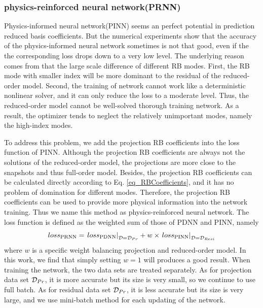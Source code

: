 \documentclass[preprint, 10pt]{elsarticle}
\begin{document}
\subsubsection{physics-reinforced neural network(PRNN)}
\label{PRNN}
Physics-informed neural network(PINN) seems an perfect potential in prediction reduced basis coefficients. But the numerical experiments show that  the accuracy of the physics-informed neural network sometimes is not that good, even if the the corresponding loss drops down to a very low level. The underlying reason comes from that the large scale difference of different RB modes.
First, the RB mode with smaller index will be more dominant to the residual of the reduced-order model. Second, the training of network cannot work like a deterministic nonlinear solver, and it can only reduce the loss to a moderate level. Thus, the reduced-order model cannot be well-solved thorough training network. As a result, the optimizer tends to neglect the relatively unimportant modes, namely the high-index modes.

To address this problem, we add the projection RB coefficients into the loss function of PINN. Although the projection RB coefficients are always not the solutions of the reduced-order model, the projections are more close to the snapshots and thus full-order model. Besides, the projection RB coefficients can be calculated directly according to Eq. \ref{eq_RBCoefficients}, and it has no problem of domination for different modes. Therefore, the projection RB coefficients can be used to provide more physical information into the network training. Thus we name this method as physics-reinforced neural network. The loss function is defined as the weighted sum of those of PDNN and PINN, namely
\begin{equation}
{loss}_{\rm{PRNN}} =
\left. {{loss}_{\rm{PDNN}}} \right|_{{\cal{D}} = {\cal {D}}_{Pr} }
+
w \times \left. {{loss}_{\rm{PINN}}} \right|_{{\cal D} = {\cal D}_{Resi }}
\end{equation}
where $w$ is a specific weight balancing projection and reduced-order model. In this work, we find that simply setting $w=1$ will produces a good result.  When training the network, the two data sets are treated separately. As for projection data set ${\cal D}_{Pr}$, it is more accurate but its size is very small, so we continue to use full batch. As for residual data set ${\cal D}_{Pr}$, it is less accurate but its size is very large, and we use mini-batch method for each updating of the network.
\end{document}
